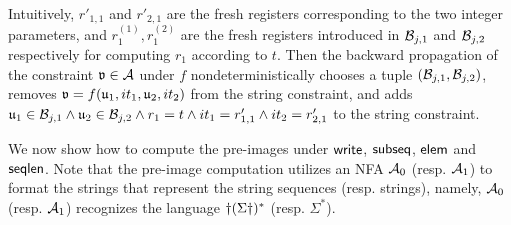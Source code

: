 {\begin{example}
	Intuitively, $r'_{1,1}$ and $r'_{2,1}$ are the fresh registers corresponding to the two integer parameters, and $r^{(1)}_1, r^{(2)}_1$ are the fresh registers introduced in $\mathcal{B}_{j, 1}$ and $\mathcal{B}_{j, 2}$ respectively for computing $r_1$ according to $t$. Then the backward propagation of the constraint $\mathfrak{v} \in \mathcal{A}$ 
	under $f$ nondeterministically chooses a tuple $(\mathcal{B}_{j, 1}, \mathcal{B}_{j, 2})$, removes $\mathfrak{v} = f(\mathfrak{u}_1, it_1, \mathfrak{u}_2, it_2)$ from the string constraint, and adds $\mathfrak{u}_1 \in \mathcal{B}_{j, 1} \wedge \mathfrak{u}_2 \in \mathcal{B}_{j, 2} \wedge r_1 = t \wedge it_1 = r'_{1,1} \wedge it_2 = r'_{2,1}$ to the string constraint.
\end{example}
}




We now show how to compute the pre-images under $\mathsf{write}$, ${\sf subseq}$, ${\sf elem}$ and $\mathsf{seqlen}$. Note that the pre-image computation utilizes an NFA $\mathcal{A}_0$ (resp. $\mathcal{A}_1$) to format the strings that represent the string sequences (resp. strings), namely, $\mathcal{A}_0$ (resp. $\mathcal{A}_1$) recognizes the language $\dag (\Sigma \dag)^*$ (resp. $\Sigma^*$). 

